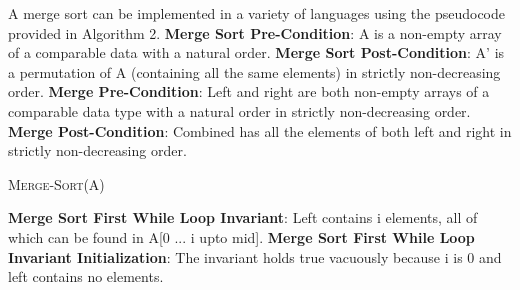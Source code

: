 \documentclass[onecolumn, 12pt, article]{IEEEtran}
\numberwithin{case}{problem}
\numberwithin{condition}{problem}
\numberwithin{condition}{subsection}
\numberwithin{definition}{section}
\theoremstyle{remark}
\numberwithin{question}{problem}
\theoremstyle{plain}
\numberwithin{answer}{problem}
\numberwithin{solution}{section}
\numberwithin{equation}{section}%
\begin{document}
A merge sort can be implemented in a variety of languages using the pseudocode provided in Algorithm 2.
\newline
\textbf{Merge Sort Pre-Condition}: A is a non-empty array of a comparable data with a natural order.
\newline
\textbf{Merge Sort Post-Condition}: A' is a permutation of A (containing all the same elements) in strictly non-decreasing order.
\newline
\textbf{Merge Pre-Condition}: Left and right are both non-empty arrays of a comparable data type with a natural order in strictly non-decreasing order.
\newline
\textbf{Merge Post-Condition}: Combined has all the elements of both left and right in strictly non-decreasing order.
\begin{algorithm}
\caption {\textsc{Merge-Sort}(A)}
\label{algo:mergesort}
\begin{algorithmic}[1]
\EndIf
{}
\EndFor
{}
\EndFor
{}
\EndProcedure
\newline
{}
	\EndIf
	\EndIf
\EndWhile
{}
\EndWhile
{}
\EndWhile
{}
\EndProcedure
\end{algorithmic}
\end{algorithm}
\newline
\textbf{Merge Sort First While Loop Invariant}: Left contains i elements, all of which can be found in A[0 ... i upto mid].
\newline
\textbf{Merge Sort First While Loop Invariant Initialization}: The invariant holds true vacuously because i is 0 and left contains no elements.
\newline
\end{document}
